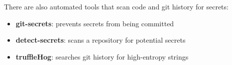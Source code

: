 \begin{codebox}[short]

\begin{Shaded}
\begin{Highlighting}[]
  \OperatorTok{=} 
  \OperatorTok{=} 
  \OperatorTok{=} 
  \OperatorTok{=}
  \OperatorTok{=}
\end{Highlighting}
\end{Shaded}

\end{codebox}

\noindent{}There are also automated tools that scan code and git history for secrets:

\begin{itemize}
\tightlist
\item
  \textbf{git-secrets}: prevents secrets from being committed
\item
  \textbf{detect-secrets}: scans a repository for potential secrets
\item
  \textbf{truffleHog}: searches git history for high-entropy strings
\end{itemize}

